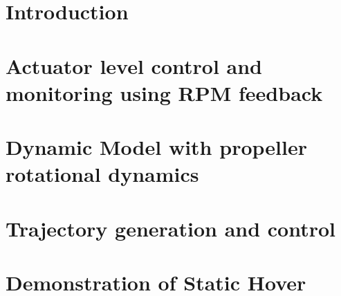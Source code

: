 \chapter{Introduction}
\chapter{Actuator level control and monitoring using RPM feedback}
\chapter{Dynamic Model with propeller rotational dynamics}
\chapter{Trajectory generation and control}
\chapter{Demonstration of Static Hover}
